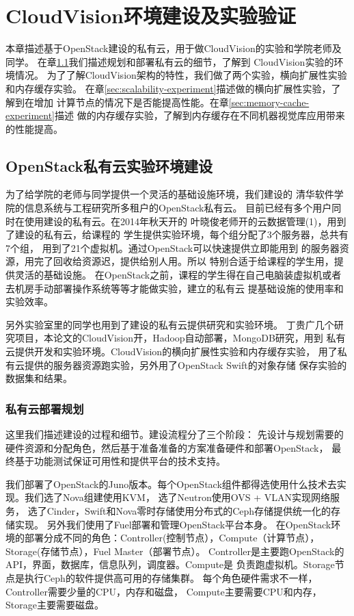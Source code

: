 \chapter{CloudVision环境建设及实验验证}
\label{cha:cloudvision_experiment}
本章描述基于OpenStack建设的私有云，用于做CloudVision的实验和学院老师及同学。
在章\ref{sec:priv-cloud-deployment}我们描述规划和部署私有云的细节，了解到
CloudVision实验的环境情况。
为了了解CloudVision架构的特性，我们做了两个实验，横向扩展性实验和内存缓存实验。
在章\ref{sec:scalability-experiment}描述做的横向扩展性实验，了解到在增加
计算节点的情况下是否能提高性能。在章\ref{sec:memory-cache-experiment}描述
做的内存缓存实验，了解到内存缓存在不同机器视觉库应用带来的性能提高。


\section{OpenStack私有云实验环境建设}
\label{sec:priv-cloud-deployment}
为了给学院的老师与同学提供一个灵活的基础设施环境，我们建设的
清华软件学院的信息系统与工程研究所多租户的OpenStack私有云。
目前已经有多个用户同时在使用建设的私有云。在2014年秋天开的
叶晓俊老师开的云数据管理(1)，用到了建设的私有云，给课程的
学生提供实验环境，每个组分配了3个服务器，总共有7个组，
用到了21个虚拟机。通过OpenStack可以快速提供立即能用到
的服务器资源，用完了回收给资源迟，提供给别人用。所以
特别合适于给课程的学生用，提供灵活的基础设施。
在OpenStack之前，课程的学生得在自己电脑装虚拟机或者
去机房手动部署操作系统等等才能做实验，建立的私有云
提基础设施的使用率和实验效率。

另外实验室里的同学也用到了建设的私有云提供研究和实验环境。
丁贵广几个研究项目，本论文的CloudVision开，Hadoop自动部署，MongoDB研究，用到
私有云提供开发和实验环境。CloudVision的横向扩展性实验和内存缓存实验，
用了私有云提供的服务器资源跑实验，另外用了OpenStack Swift的对象存储
保存实验的数据集和结果。

\subsection{私有云部署规划}
这里我们描述建设的过程和细节。建设流程分了三个阶段：
先设计与规划需要的硬件资源和分配角色，然后基于准备准备的方案准备硬件和部署OpenStack，
最终基于功能测试保证可用性和提供平台的技术支持。

我们部署了OpenStack的Juno版本。每个OpenStack组件都得选使用什么技术去实现。我们选了Nova组建使用KVM，
选了Neutron使用OVS + VLAN实现网络服务，
选了Cinder，Swift和Nova零时存储使用分布式的Ceph存储提供统一化的存储实现。
另外我们使用了Fuel部署和管理OpenStack平台本身。
在OpenStack环境的部署分成不同的角色：Controller(控制节点），Compute（计算节点），Storage(存储节点），Fuel Master（部署节点）。
Controller是主要跑OpenStack的API，界面，数据库，信息队列，调度器。Compute是
负责跑虚拟机。Storage节点是执行Ceph的软件提供高可用的存储集群。
每个角色硬件需求不一样，Controller需要少量的CPU，内存和磁盘，
Compute主要需要CPU和内存，Storage主要需要磁盘。

